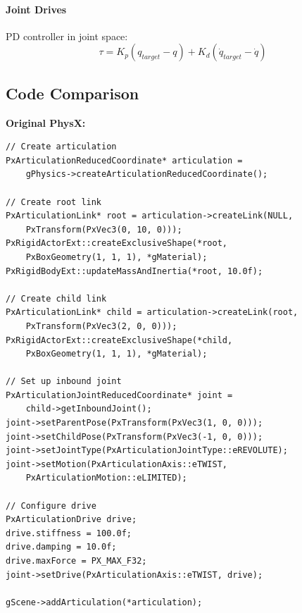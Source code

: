 \paragraph{Joint Drives}

PD controller in joint space:
\begin{equation}
\tau = K_p(q_{target} - q) + K_d(\dot{q}_{target} - \dot{q})
\end{equation}


\subsection{Code Comparison}

\textbf{Original PhysX:}
\begin{lstlisting}[caption={Manual articulation creation}]
// Create articulation
PxArticulationReducedCoordinate* articulation =
    gPhysics->createArticulationReducedCoordinate();

// Create root link
PxArticulationLink* root = articulation->createLink(NULL,
    PxTransform(PxVec3(0, 10, 0)));
PxRigidActorExt::createExclusiveShape(*root,
    PxBoxGeometry(1, 1, 1), *gMaterial);
PxRigidBodyExt::updateMassAndInertia(*root, 10.0f);

// Create child link
PxArticulationLink* child = articulation->createLink(root,
    PxTransform(PxVec3(2, 0, 0)));
PxRigidActorExt::createExclusiveShape(*child,
    PxBoxGeometry(1, 1, 1), *gMaterial);

// Set up inbound joint
PxArticulationJointReducedCoordinate* joint =
    child->getInboundJoint();
joint->setParentPose(PxTransform(PxVec3(1, 0, 0)));
joint->setChildPose(PxTransform(PxVec3(-1, 0, 0)));
joint->setJointType(PxArticulationJointType::eREVOLUTE);
joint->setMotion(PxArticulationAxis::eTWIST,
    PxArticulationMotion::eLIMITED);

// Configure drive
PxArticulationDrive drive;
drive.stiffness = 100.0f;
drive.damping = 10.0f;
drive.maxForce = PX_MAX_F32;
joint->setDrive(PxArticulationAxis::eTWIST, drive);

gScene->addArticulation(*articulation);
\end{lstlisting}

